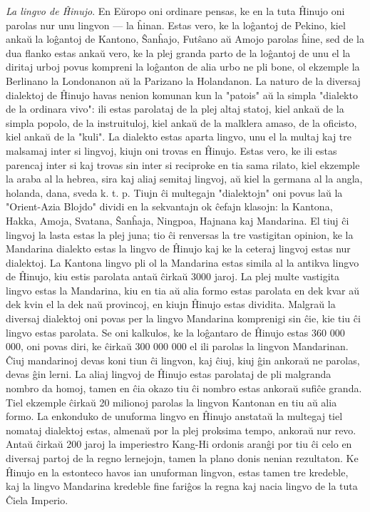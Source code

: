 \emph{La lingvo de \^Hinujo}. En E\u uropo oni ordinare pensas, ke
en la tuta \^Hinujo oni parolas nur unu lingvon --- la \^hinan.
Estas vero, ke la lo\^gantoj de Pekino, kiel anka\u u la lo\^gantoj
de Kantono, \^San\^hajo, Fut\^sano a\u u Amojo parolas \^hine, sed
de la dua flanko estas anka\u u vero, ke la plej granda parto de la
lo\^gantoj de unu el la diritaj urboj povus kompreni la lo\^ganton
de alia urbo ne pli bone, ol ekzemple la Berlinano la Londonanon a\u
u la Parizano la Holandanon. La naturo de la diversaj dialektoj de
\^Hinujo havas nenion komunan kun la "patois" a\u u la simpla
"dialekto de la ordinara vivo": ili estas parolataj de la plej
altaj statoj, kiel anka\u u de la simpla popolo, de la instruituloj,
kiel anka\u u de la malklera amaso, de la oficisto, kiel anka\u u de
la "kuli". La dialekto estas aparta lingvo, unu el la multaj kaj
tre malsamaj inter si lingvoj, kiujn oni trovas en \^Hinujo. Estas
vero, ke ili estas parencaj inter si kaj trovas sin inter si
reciproke en tia sama rilato, kiel ekzemple la araba al la hebrea,
sira kaj aliaj semitaj lingvoj, a\u u kiel la germana al la angla,
holanda, dana, sveda k. t. p. Tiujn \^ci multegajn "dialektojn"
oni povus la\u u la "Orient-Azia Blojdo" dividi en la sekvantajn
ok \^cefajn klasojn: la Kantona, Hakka, Amoja, Svatana, \^San\^haja,
Ningpoa, Hajnana kaj Mandarina. El tiuj \^ci lingvoj la lasta estas
la plej juna; tio \^ci renversas la tre vastigitan opinion, ke la
Mandarina dialekto estas la lingvo de \^Hinujo kaj ke la ceteraj
lingvoj estas nur dialektoj. La Kantona lingvo pli ol la Mandarina
estas simila al la antikva lingvo de \^Hinujo, kiu estis parolata
anta\u u \^cirka\u u 3000 jaroj. La plej multe vastigita lingvo
estas la Mandarina, kiu en tia a\u u alia formo estas parolata en
dek kvar a\u u dek kvin el la dek na\u u provincoj, en kiujn
\^Hinujo estas dividita. Malgra\u u la diversaj dialektoj oni povas
per la lingvo Mandarina komprenigi sin \^cie, kie tiu \^ci lingvo
estas parolata. Se oni kalkulos, ke la lo\^gantaro de \^Hinujo estas
360 000 000, oni povas diri, ke \^cirka\u u 300 000 000 el ili
parolas la lingvon Mandarinan. \^Ciuj mandarinoj devas koni tiun
\^ci lingvon, kaj \^ciuj, kiuj \^gin ankora\u u ne parolas, devas
\^gin lerni. La aliaj lingvoj de \^Hinujo estas parolataj de pli
malgranda nombro da homoj, tamen en \^cia okazo tiu \^ci nombro
estas ankora\u u sufi\^ce granda. Tiel ekzemple \^cirka\u u 20
milionoj parolas la lingvon Kantonan en tiu a\u u alia formo. La
enkonduko de unuforma lingvo en \^Hinujo anstata\u u la multegaj
tiel nomataj dialektoj estas, almena\u u por la plej proksima tempo,
ankora\u u nur revo. Anta\u u \^cirka\u u 200 jaroj la imperiestro
Kang-Hi ordonis aran\^gi por tiu \^ci celo en diversaj partoj de la
regno lernejojn, tamen la plano donis nenian rezultaton. Ke \^Hinujo
en la estonteco havos ian unuforman lingvon, estas tamen tre
kredeble, kaj la lingvo Mandarina kredeble fine fari\^gos la regna
kaj nacia lingvo de la tuta \^Ciela Imperio.

